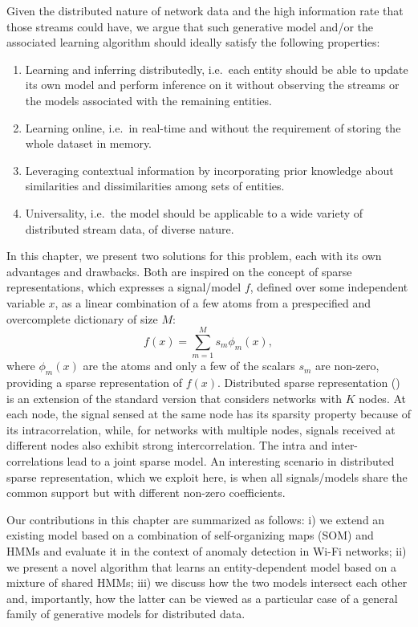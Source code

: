Given the distributed nature of network data and the high information rate that those streams could have, we argue that such generative model and/or the associated learning algorithm should ideally satisfy the following properties:
\begin{enumerate}
	\item Learning and inferring distributedly, i.e.\ each entity should be able to update its own model and perform inference on it without observing the streams or the models associated with the remaining entities.
	\item Learning online, i.e.\ in real-time and without the requirement of storing the whole dataset in memory.
	\item Leveraging contextual information by incorporating prior knowledge about similarities and dissimilarities among sets of entities.
	\item Universality, i.e.\ the model should be applicable to a wide variety of distributed stream data, of diverse nature.
\end{enumerate}
In this chapter, we present two solutions for this problem, each with its own advantages and drawbacks. Both are inspired on the concept of sparse representations, which expresses a signal/model $f$, defined over some independent variable $x$, as a linear combination of a few atoms from a prespecified and overcomplete dictionary of size $M$:
\begin{equation}
\label{eq:sparse_coding}
f(x)=\sum_{m=1}^M s_m \phi_m(x),
\end{equation}
where $\phi_m(x)$ are the atoms and only a few of the scalars $s_m$ are non-zero, providing a sparse representation of $f(x)$.  Distributed sparse representation (\citet{Baron}) is an extension of the standard version that considers networks with $K$ nodes. At each node, the signal sensed at the same node has its sparsity property because of its intracorrelation, while, for networks with multiple nodes, signals received at different nodes also exhibit strong intercorrelation.
The intra and inter-correlations lead to a joint sparse model. An interesting scenario in distributed sparse representation, which we exploit here, is when all signals/models share the common support but with different non-zero coefficients.

Our contributions in this chapter are summarized as follows: i) we extend an existing model based on a combination of self-organizing maps (SOM) and HMMs and evaluate it in the context of anomaly detection in Wi-Fi networks; ii) we present a novel algorithm that learns an entity-dependent model based on a mixture of shared HMMs; iii) we discuss how the two models intersect each other and, importantly, how the latter can be viewed as a particular case of a general family of generative models for distributed data.

